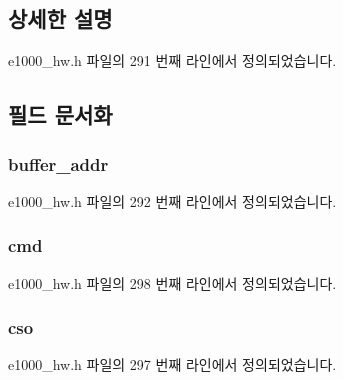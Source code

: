 \subsection{상세한 설명}


e1000\+\_\+hw.\+h 파일의 291 번째 라인에서 정의되었습니다.



\subsection{필드 문서화}
\subsubsection[{\texorpdfstring{buffer\+\_\+addr}{buffer_addr}}]{ buffer\+\_\+addr}\hypertarget{structe1000__tx__desc_a87d79130b57fb21eedf04b9d3945c3d6}{}\label{structe1000__tx__desc_a87d79130b57fb21eedf04b9d3945c3d6}


e1000\+\_\+hw.\+h 파일의 292 번째 라인에서 정의되었습니다.

\subsubsection[{\texorpdfstring{cmd}{cmd}}]{ cmd}\hypertarget{structe1000__tx__desc_a0c40b83f263927828422c91c3e9828be}{}\label{structe1000__tx__desc_a0c40b83f263927828422c91c3e9828be}


e1000\+\_\+hw.\+h 파일의 298 번째 라인에서 정의되었습니다.

\subsubsection[{\texorpdfstring{cso}{cso}}]{ cso}\hypertarget{structe1000__tx__desc_abc3a9e598b374e8a83e67df82af4e21a}{}\label{structe1000__tx__desc_abc3a9e598b374e8a83e67df82af4e21a}


e1000\+\_\+hw.\+h 파일의 297 번째 라인에서 정의되었습니다.


